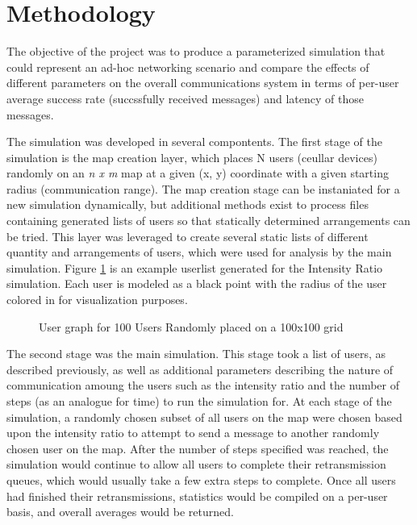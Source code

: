 \section{Methodology}
The objective of the project was to produce a parameterized simulation 
that could represent an ad-hoc networking scenario and compare the effects 
of different parameters on the overall communications system in terms of 
per-user average success rate (succssfully received messages) 
and latency of those messages.

The simulation was developed in several compontents.
The first stage of the simulation is the map creation layer,
which places N users (ceullar devices) randomly on an \textit{n x m} map at a
given (x, y) coordinate with a given starting radius (communication range).
The map creation stage can be instaniated for a new simulation dynamically, 
but additional methods exist to process files containing generated lists of 
users so that statically determined arrangements can be tried.
This layer was leveraged to create several static lists of different quantity
and arrangements of users, which were used for analysis by the main simulation.
Figure \ref{fig:usergraph} is an example userlist generated for the Intensity Ratio simulation.
Each user is modeled as a black point with the radius of the user colored in
for visualization purposes.
\par
\begin{figure}
    
    \caption{User graph for 100 Users Randomly placed on a 100x100 grid}
    \label{fig:usergraph}
\end{figure}
\par

The second stage was the main simulation.
This stage took a list of users, as described previously, as well as additional
parameters describing the nature of communication amoung the users such as
the intensity ratio and the number of steps (as an analogue for time) to run 
the simulation for.
At each stage of the simulation, a randomly chosen subset of all users on the map
were chosen based upon the intensity ratio to attempt to send a message to another
randomly chosen user on the map.
After the number of steps specified was reached, the simulation would continue
to allow all users to complete their retransmission queues, which would usually
take a few extra steps to complete.
Once all users had finished their retransmissions, statistics would be compiled
on a per-user basis, and overall averages would be returned.

